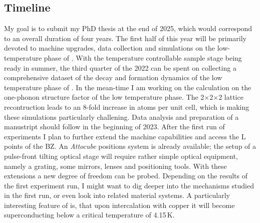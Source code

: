 \subsection*{Timeline}
My goal is to submit my PhD thesis at the end of 2025, which would correspond to an overall duration of four years.
The first half of this year will be primarily devoted to machine upgrades, data collection and simulations on the low-temperature phase of \ts.
With the temperature controllable sample stage being ready in summer, the third quarter of the 2022 can be spent on collecting a comprehensive dataset of the decay and formation dynamics of the low temperature phase of \ts.
In the mean-time I am working on the calculation on the one-phonon structure factor of the low temperature phase.
The 2$\times$2$\times$2 lattice recontruction leads to an 8-fold increase in atoms per unit cell, which is making these simulations particularly challening.
Data analysis and preparation of a manustript should follow in the beginning of 2023.
After the first run of experiments I plan to further extend the machine capabilities and access the L points of the \ac{BZ}.
An \emph{Attocube} positions system is already available; the setup of a pulse-front tilting optical stage will require rather simple optical equipment, namely a grating, some mirrors, lenses and positioning tools.
With these extensions a new degree of freedom can be probed.
Depending on the results of the first experiment run, I might want to dig deeper into the mechanisms studied in the first run, or even look into related material systems.
A particularly interesting feature of \ts\space is, that upon intercalation with copper it will become superconducting below a critical temperature of 4.15\,K\cite{morosan2006}.

